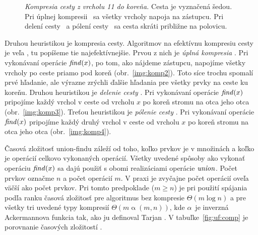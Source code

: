 \begin{figure}
\label{img:kompresia}
\caption{\emph{Kompresia cesty z vrcholu 11 do koreňa.} 
Cesta je vyznačená šedou. 
Pri úplnej kompresii~ sa všetky vrcholy 
napoja na zástupcu. Pri delení cesty~ a pólení 
cesty~ sa cesta skráti približne na polovicu.}
\end{figure}
 
Druhou heuristikou je kompresia cesty. Algoritmov na efektívnu kompresiu 
cesty je veľa \citep{paths2}, tu popíšeme tie najefektívnejšie. Prvou z nich 
je \emph{úplná kompresia} \citep{comp1}. Pri vykonávaní operácie $\mathop{\mathit{find}}(x)$, po 
tom, ako nájdeme zástupcu, napojíme všetky vrcholy po ceste priamo pod koreň 
(obr.~\ref{img:komp2}). Toto síce trochu spomalí prvé hľadanie, ale výrazne 
zrýchli ďalšie hľadania pre všetky prvky na ceste ku koreňu. Druhou 
heuristikou je \emph{delenie cesty} \citep{comp2}. Pri vykonávaní operácie 
$\mathop{\mathit{find}}(x)$ pripojíme každý vrchol v ceste od vrcholu $x$ po koreň stromu na otca 
jeho otca (obr.~\ref{img:komp3}). Treťou heuristikou je \emph{pólenie cesty} 
\citep{comp2}. Pri vykonávaní operácie $\mathop{\mathit{find}}(x)$  pripojíme každý druhý vrchol 
v ceste od vrcholu $x$ po koreň stromu na otca jeho otca 
(obr.~\ref{img:komp4}).

Časová zložitosť union-findu záleží od toho, koľko prvkov je v množinách a koľko je 
operácií celkovo vykonaných operácií. Všetky uvedené spôsoby ako vykonať 
operáciu $\mathop{\mathit{find}}(x)$ sa dajú použiť s obomi realizáciami operácie $\mathop{\mathit{union}}$. 
Počet prvkov označme $n$ a počet operácií $m$. V praxi je zvyčajne počet 
operácií oveľa väčší ako počet prvkov. Pri tomto predpoklade ($m\geq n$) je 
pri použití spájania podľa ranku časová zložitosť pre algoritmus bez kompresie 
$\Theta(m\log n)$ a pre všetky tri uvedené typy kompresií 
$\Theta(m\mathop{\alpha}(m,n))$, kde $\alpha$ je inverzná Ackermannova funkcia 
tak, ako ju definoval Tarjan \citep{dsna}. 
V tabuľke~\ref{fig:uf:comp} je porovnanie časových zložitostí \citep{paths2}.

